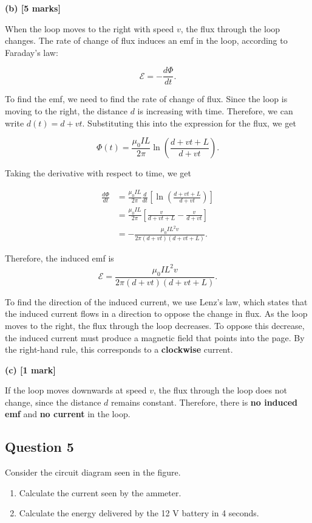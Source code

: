 \documentclass{article}
\begin{document}
\textbf{(b) [5 marks]}

When the loop moves to the right with speed $v$, the flux through the loop changes.  The rate of change of flux induces an emf in the loop, according to Faraday's law:

\begin{equation*}
\mathcal{E} = -\frac{d\Phi}{dt}.
\end{equation*}

To find the emf, we need to find the rate of change of flux. Since the loop is moving to the right, the distance $d$ is increasing with time. Therefore, we can write $d(t) = d + vt$.  Substituting this into the expression for the flux, we get

\begin{equation*}
\Phi(t) = \frac{\mu_0 I L}{2 \pi} \ln \left( \frac{d + vt + L}{d + vt} \right).
\end{equation*}

Taking the derivative with respect to time, we get

\begin{align*}
\frac{d\Phi}{dt} &= \frac{\mu_0 I L}{2 \pi} \frac{d}{dt} \left[ \ln \left( \frac{d + vt + L}{d + vt} \right) \right] \\
&= \frac{\mu_0 I L}{2 \pi} \left[ \frac{v}{d + vt + L} - \frac{v}{d + vt} \right] \\
&= -\frac{\mu_0 I L^2 v}{2 \pi (d + vt)(d + vt + L)}.
\end{align*}

Therefore, the induced emf is
\begin{equation*}
\mathcal{E} = \boxed{\frac{\mu_0 I L^2 v}{2 \pi (d + vt)(d + vt + L)}}.
\end{equation*}

To find the direction of the induced current, we use Lenz's law, which states that the induced current flows in a direction to oppose the change in flux. As the loop moves to the right, the flux through the loop decreases. To oppose this decrease, the induced current must produce a magnetic field that points into the page. By the right-hand rule, this corresponds to a \textbf{clockwise} current.


\textbf{(c) [1 mark]}

If the loop moves downwards at speed $v$, the flux through the loop does not change, since the distance $d$ remains constant. Therefore, there is \textbf{no induced emf} and \textbf{no current} in the loop.


\subsection{Question 5}
Consider the circuit diagram seen in the figure.
\begin{enumerate}
    \item Calculate the current seen by the ammeter.
    \item Calculate the energy delivered by the 12 V battery in 4 seconds.
\end{enumerate}
\end{document}
